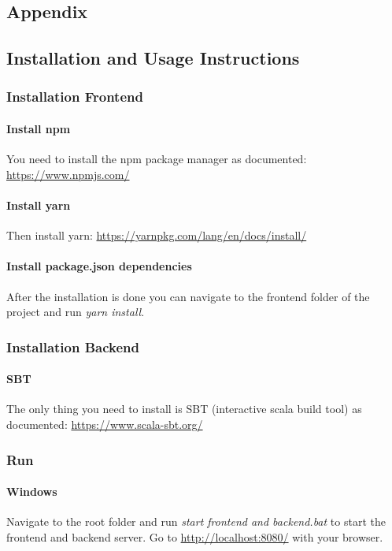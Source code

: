 \begin{appendices}
\chapter{Appendix}

\section{Installation and Usage Instructions}
\subsection{Installation Frontend}
\subsubsection{Install npm}
You need to install the npm package manager as documented: \url{https://www.npmjs.com/}

\subsubsection{Install yarn}
Then install yarn: \url{https://yarnpkg.com/lang/en/docs/install/}

\subsubsection{Install package.json dependencies}
After the installation is done you can navigate to the frontend folder of the project and run \textit{yarn install}.

\subsection{Installation Backend}
\subsubsection{SBT}
The only thing you need to install is SBT (interactive scala build tool) as documented: \url{https://www.scala-sbt.org/}

\subsection{Run}
\subsubsection{Windows}
Navigate to the root folder and run \textit{start frontend and backend.bat} to start the frontend and backend server. Go to \url{http://localhost:8080/} with your browser.


\end{appendices}
